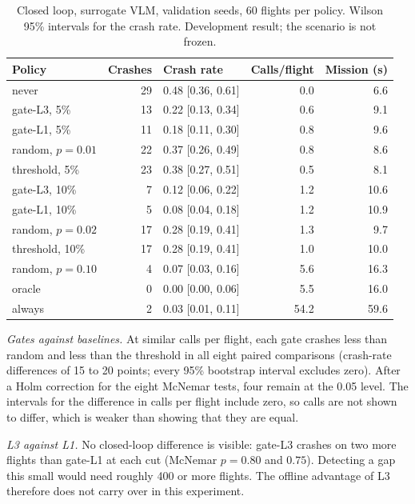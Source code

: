 \begin{table}[t]
\centering
\caption{Closed loop, surrogate VLM, validation seeds, 60 flights per policy. Wilson 95\% intervals for the crash rate.
Development result; the scenario is not frozen.}
\label{tab:flight}
\begin{tabular}{@{}lrlrr@{}}
\toprule
Policy & Crashes & Crash rate & Calls/flight & Mission (s) \\
\midrule
never                  & 29 & 0.48 [0.36, 0.61] & 0.0  & 6.6 \\
\midrule
gate-L3, 5\%           & 13 & 0.22 [0.13, 0.34] & 0.6  & 9.1 \\
gate-L1, 5\%           & 11 & 0.18 [0.11, 0.30] & 0.8  & 9.6 \\
random, $p=0.01$       & 22 & 0.37 [0.26, 0.49] & 0.8  & 8.6 \\
threshold, 5\%         & 23 & 0.38 [0.27, 0.51] & 0.5  & 8.1 \\
\midrule
gate-L3, 10\%          &  7 & 0.12 [0.06, 0.22] & 1.2  & 10.6 \\
gate-L1, 10\%          &  5 & 0.08 [0.04, 0.18] & 1.2  & 10.9 \\
random, $p=0.02$       & 17 & 0.28 [0.19, 0.41] & 1.3  & 9.7 \\
threshold, 10\%        & 17 & 0.28 [0.19, 0.41] & 1.0  & 10.0 \\
\midrule
random, $p=0.10$       &  4 & 0.07 [0.03, 0.16] & 5.6  & 16.3 \\
oracle                 &  0 & 0.00 [0.00, 0.06] & 5.5  & 16.0 \\
always                 &  2 & 0.03 [0.01, 0.11] & 54.2 & 59.6 \\
\bottomrule
\end{tabular}
\end{table}

\emph{Gates against baselines.} At similar calls per flight, each gate crashes less than random and less than the
threshold in all eight paired comparisons (crash-rate differences of 15 to 20 points; every 95\% bootstrap interval
excludes zero). After a Holm correction for the eight McNemar tests, four remain at the 0.05 level. The intervals
for the difference in calls per flight include zero, so calls are not shown to differ, which is weaker than showing
that they are equal.

\emph{L3 against L1.} No closed-loop difference is visible: gate-L3 crashes on two more flights than gate-L1 at each
cut (McNemar $p = 0.80$ and $0.75$). Detecting a gap this small would need roughly 400 or more flights. The offline
advantage of L3 therefore does not carry over in this experiment.

